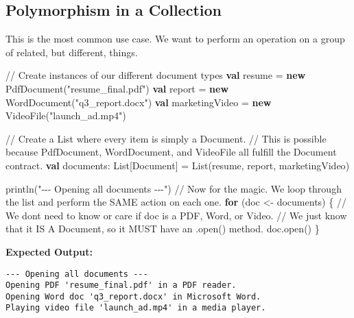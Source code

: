 \documentclass[
  letterpaper,
  DIV=11,
  numbers=noendperiod]{scrreprt}
\newenvironment{Shaded}{\begin{snugshade}}{\end{snugshade}}
\newcommand{\CommentTok}[1]{\textcolor[rgb]{0.37,0.37,0.37}{#1}}
\newcommand{\ControlFlowTok}[1]{\textcolor[rgb]{0.00,0.23,0.31}{\textbf{#1}}}
\newcommand{\ExtensionTok}[1]{\textcolor[rgb]{0.00,0.23,0.31}{#1}}
\newcommand{\FunctionTok}[1]{\textcolor[rgb]{0.28,0.35,0.67}{#1}}
\newcommand{\KeywordTok}[1]{\textcolor[rgb]{0.00,0.23,0.31}{\textbf{#1}}}
\newcommand{\NormalTok}[1]{\textcolor[rgb]{0.00,0.23,0.31}{#1}}
\newcommand{\OperatorTok}[1]{\textcolor[rgb]{0.37,0.37,0.37}{#1}}
\newcommand{\StringTok}[1]{\textcolor[rgb]{0.13,0.47,0.30}{#1}}
\begin{document}
\subsection{Polymorphism in a
Collection}\label{polymorphism-in-a-collection}

This is the most common use case. We want to perform an operation on a
group of related, but different, things.

\begin{Shaded}
\begin{Highlighting}[]
\CommentTok{// Create instances of our different document types}
\KeywordTok{val}\NormalTok{ resume }\OperatorTok{=} \KeywordTok{new} \FunctionTok{PdfDocument}\OperatorTok{(}\StringTok{"resume\_final.pdf"}\OperatorTok{)}
\KeywordTok{val}\NormalTok{ report }\OperatorTok{=} \KeywordTok{new} \FunctionTok{WordDocument}\OperatorTok{(}\StringTok{"q3\_report.docx"}\OperatorTok{)}
\KeywordTok{val}\NormalTok{ marketingVideo }\OperatorTok{=} \KeywordTok{new} \FunctionTok{VideoFile}\OperatorTok{(}\StringTok{"launch\_ad.mp4"}\OperatorTok{)}

\CommentTok{// Create a List where every item is simply a \textquotesingle{}Document\textquotesingle{}.}
\CommentTok{// This is possible because PdfDocument, WordDocument, and VideoFile all fulfill the Document contract.}
\KeywordTok{val}\NormalTok{ documents}\OperatorTok{:} \ExtensionTok{List}\OperatorTok{[}\ExtensionTok{Document}\OperatorTok{]} \OperatorTok{=} \ExtensionTok{List}\OperatorTok{(}\NormalTok{resume}\OperatorTok{,}\NormalTok{ report}\OperatorTok{,}\NormalTok{ marketingVideo}\OperatorTok{)}

\FunctionTok{println}\OperatorTok{(}\StringTok{"{-}{-}{-} Opening all documents {-}{-}{-}"}\OperatorTok{)}
\CommentTok{// Now for the magic. We loop through the list and perform the SAME action on each one.}
\ControlFlowTok{for} \OperatorTok{(}\NormalTok{doc }\OperatorTok{\textless{}{-}}\NormalTok{ documents}\OperatorTok{)} \OperatorTok{\{}
  \CommentTok{// We don\textquotesingle{}t need to know or care if \textquotesingle{}doc\textquotesingle{} is a PDF, Word, or Video.}
  \CommentTok{// We just know that it IS A Document, so it MUST have an .open() method.}
\NormalTok{  doc}\OperatorTok{.}\FunctionTok{open}\OperatorTok{()}
\OperatorTok{\}}
\end{Highlighting}
\end{Shaded}

\textbf{Expected Output:}

\begin{verbatim}
--- Opening all documents ---
Opening PDF 'resume_final.pdf' in a PDF reader.
Opening Word doc 'q3_report.docx' in Microsoft Word.
Playing video file 'launch_ad.mp4' in a media player.
\end{verbatim}
\end{document}
